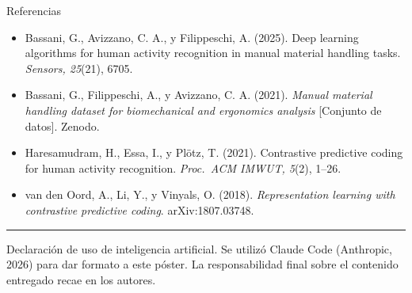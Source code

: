 \documentclass[10pt]{article}
\newcommand{\serif}{\fontfamily{bch}\selectfont}
\newcommand{\seccion}[1]{%
  \begin{tcolorbox}[colback=olive,colframe=olive,arc=0pt,
    boxrule=0pt,left=8pt,top=3pt,bottom=4pt,width=\linewidth]
    {\serif\color{white}\fontsize{30}{36}\selectfont #1}
  \end{tcolorbox}\vspace{-0.3em}}
\newlength{\colh}
\begin{document}
\begin{minipage}[t][\colh][s]{0.30\linewidth}
\vfill
\seccion{Referencias}
{\fontsize{18}{23}\selectfont
\begin{itemize}[leftmargin=1.2em,itemsep=0.2em]
  \item Bassani, G., Avizzano, C. A., y Filippeschi, A. (2025). Deep learning algorithms for human activity recognition in manual material handling tasks. \emph{Sensors, 25}(21), 6705.
  \item Bassani, G., Filippeschi, A., y Avizzano, C. A. (2021). \emph{Manual material handling dataset for biomechanical and ergonomics analysis} [Conjunto de datos]. Zenodo.
  \item Haresamudram, H., Essa, I., y Plötz, T. (2021). Contrastive predictive coding for human activity recognition. \emph{Proc.\ ACM IMWUT, 5}(2), 1--26.
  \item van den Oord, A., Li, Y., y Vinyals, O. (2018). \emph{Representation learning with contrastive predictive coding}. arXiv:1807.03748.
\end{itemize}}

\end{minipage}

\vfill
{\color{olive}\rule{\linewidth}{2.5pt}}
\vspace{0.3cm}

\noindent
{\fontsize{18}{23}\selectfont\color{ink}
{\serif\color{olivedark}\fontsize{22}{28}\selectfont Declaración de uso de inteligencia artificial.}
Se utilizó Claude Code (Anthropic, 2026) para dar formato a este póster.
La responsabilidad final sobre el contenido entregado recae en los autores.\par}
\end{document}

